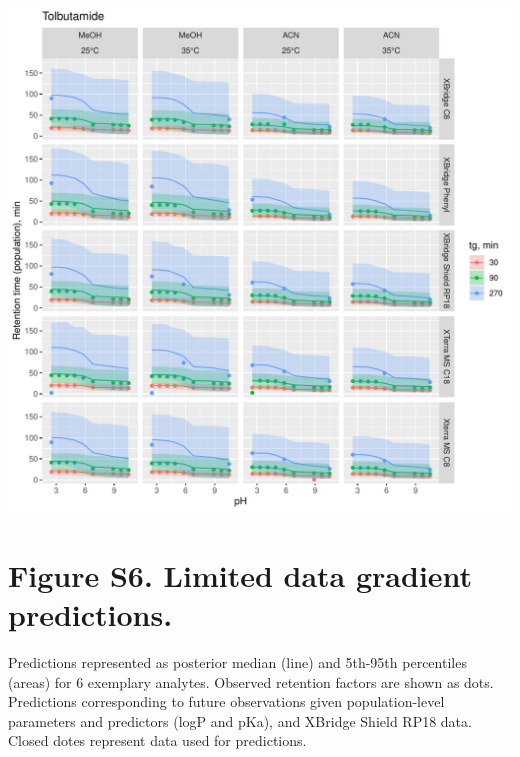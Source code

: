 \documentclass[
]{article}
\begin{document}
\newpage{}

\includegraphics{../figures/concordanceplots/Tolbutamide.population.pdf}

\newpage{}

\hypertarget{figure-s6.-limited-data-gradient-predictions.}{%
\section{Figure S6. Limited data gradient
predictions.}\label{figure-s6.-limited-data-gradient-predictions.}}

Predictions represented as posterior median (line) and 5th-95th
percentiles (areas) for 6 exemplary analytes. Observed retention factors
are shown as dots. Predictions corresponding to future observations
given population-level parameters and predictors (logP and pKa), and
XBridge Shield RP18 data. Closed dotes represent data used for
predictions.
\end{document}
